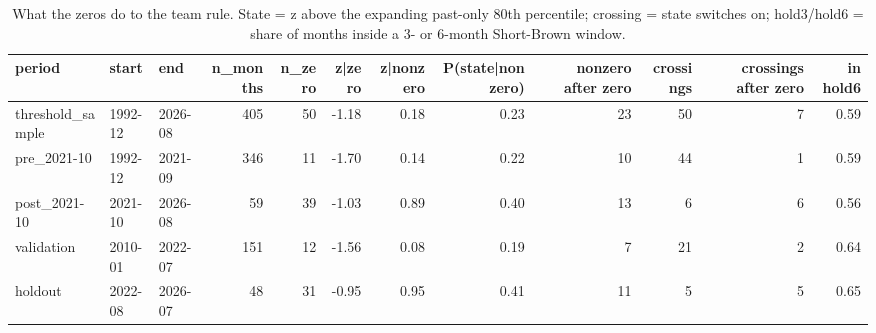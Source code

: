 \begin{table}
\caption{What the zeros do to the team rule. State = z above the expanding past-only 80th percentile; crossing = state switches on; hold3/hold6 = share of months inside a 3- or 6-month Short-Brown window.}
\label{tab:m1_zero_mech}
\begin{tabular}{lllrrrrrrrrr}
\toprule
period & start & end & n\_months & n\_zero & z|zero & z|nonzero & P(state|nonzero) & nonzero after zero & crossings & crossings after zero & in hold6 \\
\midrule
threshold\_sample & 1992-12 & 2026-08 & 405 & 50 & -1.18 & 0.18 & 0.23 & 23 & 50 & 7 & 0.59 \\
pre\_2021-10 & 1992-12 & 2021-09 & 346 & 11 & -1.70 & 0.14 & 0.22 & 10 & 44 & 1 & 0.59 \\
post\_2021-10 & 2021-10 & 2026-08 & 59 & 39 & -1.03 & 0.89 & 0.40 & 13 & 6 & 6 & 0.56 \\
validation & 2010-01 & 2022-07 & 151 & 12 & -1.56 & 0.08 & 0.19 & 7 & 21 & 2 & 0.64 \\
holdout & 2022-08 & 2026-07 & 48 & 31 & -0.95 & 0.95 & 0.41 & 11 & 5 & 5 & 0.65 \\
\bottomrule
\end{tabular}
\end{table}
